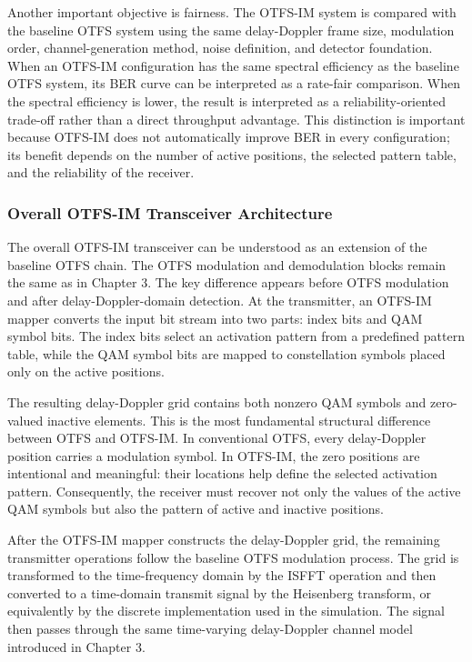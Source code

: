 Another important objective is fairness. The OTFS-IM system is compared with the baseline OTFS system using the same delay-Doppler frame size, modulation order, channel-generation method, noise definition, and detector foundation. When an OTFS-IM configuration has the same spectral efficiency as the baseline OTFS system, its BER curve can be interpreted as a rate-fair comparison. When the spectral efficiency is lower, the result is interpreted as a reliability-oriented trade-off rather than a direct throughput advantage. This distinction is important because OTFS-IM does not automatically improve BER in every configuration; its benefit depends on the number of active positions, the selected pattern table, and the reliability of the receiver.

\subsubsection{Overall OTFS-IM Transceiver Architecture}

The overall OTFS-IM transceiver can be understood as an extension of the baseline OTFS chain. The OTFS modulation and demodulation blocks remain the same as in Chapter 3. The key difference appears before OTFS modulation and after delay-Doppler-domain detection. At the transmitter, an OTFS-IM mapper converts the input bit stream into two parts: index bits and QAM symbol bits. The index bits select an activation pattern from a predefined pattern table, while the QAM symbol bits are mapped to constellation symbols placed only on the active positions.

The resulting delay-Doppler grid contains both nonzero QAM symbols and zero-valued inactive elements. This is the most fundamental structural difference between OTFS and OTFS-IM. In conventional OTFS, every delay-Doppler position carries a modulation symbol. In OTFS-IM, the zero positions are intentional and meaningful: their locations help define the selected activation pattern. Consequently, the receiver must recover not only the values of the active QAM symbols but also the pattern of active and inactive positions.

After the OTFS-IM mapper constructs the delay-Doppler grid, the remaining transmitter operations follow the baseline OTFS modulation process. The grid is transformed to the time-frequency domain by the ISFFT operation and then converted to a time-domain transmit signal by the Heisenberg transform, or equivalently by the discrete implementation used in the simulation. The signal then passes through the same time-varying delay-Doppler channel model introduced in Chapter 3.

